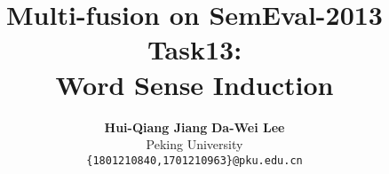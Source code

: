 \documentclass[12pt]{article}
\title{\textbf{Multi-fusion on SemEval-2013 Task13: \\ Word Sense Induction}}
\author{\textbf{Hui-Qiang Jiang} \quad \textbf{Da-Wei Lee} \\
Peking University \\
{\tt \{1801210840,1701210963\}@pku.edu.cn}}
\date{\vspace{-5ex}}
\begin{document}
\maketitle
\begin{abstract}
  
\end{abstract}

\begin{multicols}{2}





\end{multicols}







\end{document}
